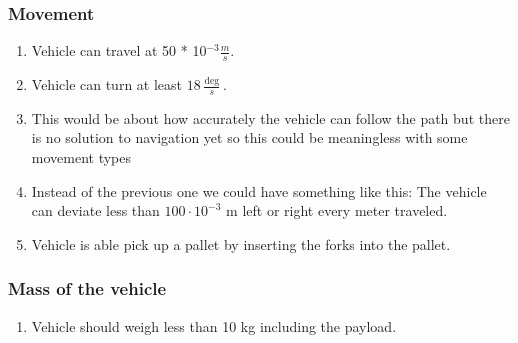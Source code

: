 \documentclass[../report.tex]{subfiles}
\begin{document}
        \subsubsection{Movement}
           \begin{center}
                \begin{enumerate}
                    \item Vehicle can travel at 50 * 10$^{-3} \frac{m}{s}$.
                    \item Vehicle can turn at least $18 \frac{\deg }{s}$. %
                    \item This would be about how accurately the vehicle can follow the path but there is no solution to navigation yet so this could be meaningless with some movement types
                    \item Instead of the previous one we could have something like this: The vehicle can deviate less than $100 \cdot 10^{-3}$ m left or right every meter traveled.
                    \item Vehicle is able pick up a pallet by inserting the forks into the pallet. %
                \end{enumerate}
            \end{center}

        \subsubsection{Mass of the vehicle}
        \begin{center}
            \begin{enumerate}
                \item Vehicle should weigh less than 10 kg including the payload. %
            \end{enumerate}
        \end{center}
\end{document}
